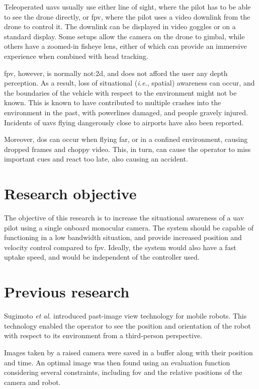 Teleoperated \glspl{uav} usually use either line of sight, where the pilot has to be able to see the drone directly, or \gls{fpv}, where the pilot uses a video downlink from the drone to control it.
The downlink can be displayed in video goggles or on a standard display.
Some setups allow the camera on the drone to gimbal, while others have a zoomed-in fisheye lens, either of which can provide an immersive experience when combined with head tracking.

\gls{fpv}, however, is normally \gls{not:2d}, and does not afford the user any depth perception.
As a result, loss of situational (\emph{i.e.}, spatial) awareness can occur, and the boundaries of the vehicle with respect to the environment might not be known.
This is known to have contributed to multiple crashes into the environment in the past, with powerlines damaged,\cite{latimes2015} and people gravely injured.\cite{seattletimes2015,bbcnews2015}
Incidents of \glspl{uav} flying dangerously close to airports have also been reported.\cite{ctvnews2014}

Moreover, \gls{dos} can occur when flying far, or in a confined environment, causing dropped frames and choppy video.
This, in turn, can cause the operator to miss important cues and react too late, also causing an accident.

\section{Research objective}
The objective of this research is to increase the situational awareness of a \gls{uav} pilot using a single onboard monocular camera.
The system should be capable of functioning in a low bandwidth situation, and provide increased position and velocity control compared to \gls{fpv}.
Ideally, the system would also have a fast uptake speed, and would be independent of the controller used.

\section{Previous research}
Sugimoto \emph{et al.} introduced past-image view technology for mobile robots.\cite{sugimoto2005}
This technology enabled the operator to see the position and orientation of the robot with respect to its environment from a third-person perspective.

Images taken by a raised camera were saved in a buffer along with their position and time.
An optimal image was then found using an evaluation function considering several constraints, including \gls{fov} and the relative positions of the camera and robot.

